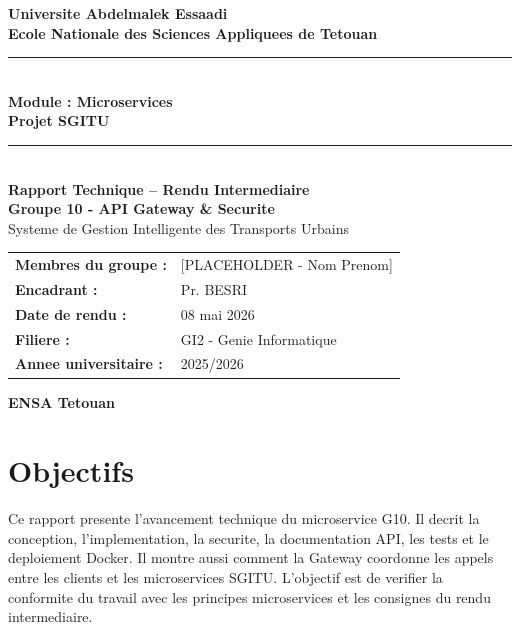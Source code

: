 \documentclass[12pt, a4paper]{article}
\begin{document}
\thispagestyle{empty}
\begin{titlepage}
\begin{center}
\vspace*{1cm}
{\large\bfseries Universite Abdelmalek Essaadi}\\[4pt]
{\large\bfseries Ecole Nationale des Sciences Appliquees de Tetouan}\\[1cm]
\rule{\linewidth}{1pt}\\[0.4cm]
{\Large\bfseries Module : Microservices}\\[0.3cm]
{\Large\bfseries Projet SGITU}\\[0.4cm]
\rule{\linewidth}{1pt}\\[1.2cm]
{\fontsize{24}{29}\bfseries\selectfont Rapport Technique -- Rendu Intermediaire}\\[0.5cm]
{\fontsize{21}{26}\bfseries\selectfont Groupe 10 - API Gateway \& Securite}\\[0.4cm]
{\fontsize{15}{19}\selectfont Systeme de Gestion Intelligente des Transports Urbains}\\[1.2cm]
\begin{tabular}{>{\bfseries}p{4.3cm} p{8cm}}
Membres du groupe : & [PLACEHOLDER - Nom Prenom] \\
Encadrant : & Pr. BESRI \\
Date de rendu : & 08 mai 2026 \\
Filiere : & GI2 - Genie Informatique \\
Annee universitaire : & 2025/2026 \\
\end{tabular}
\vfill
{\large\bfseries ENSA Tetouan}
\end{center}
\end{titlepage}

\newpage
\setcounter{page}{2}

\section*{Objectifs}
Ce rapport presente l'avancement technique du microservice G10. Il decrit la conception, l'implementation, la securite, la documentation API, les tests et le deploiement Docker. Il montre aussi comment la Gateway coordonne les appels entre les clients et les microservices SGITU. L'objectif est de verifier la conformite du travail avec les principes microservices et les consignes du rendu intermediaire.

\newpage
\tableofcontents
\newpage
\end{document}

